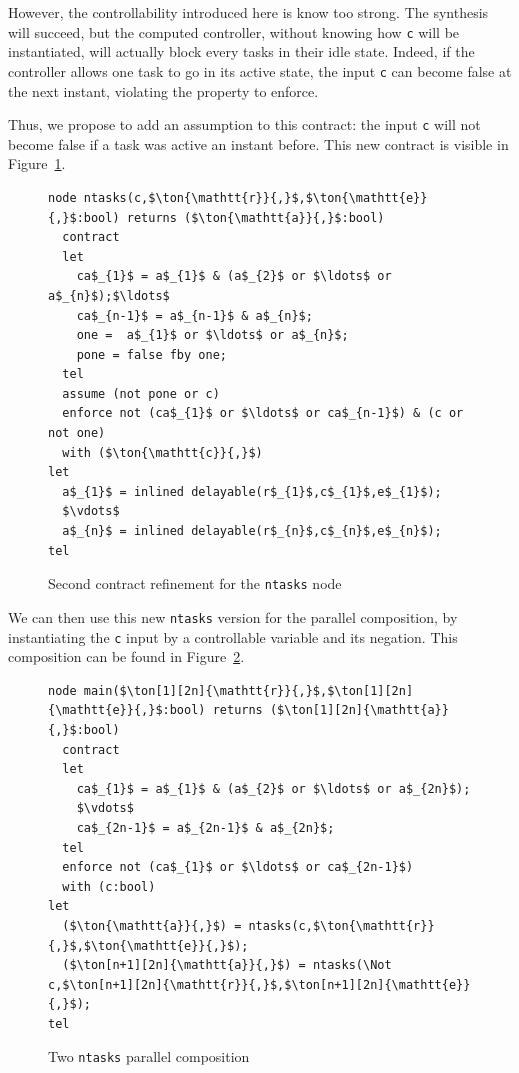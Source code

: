\documentclass[a4paper]{article}
\begin{document}
However, the controllability introduced here is know too strong. The synthesis
will succeed, but the computed controller, without knowing how \texttt{c} will
be instantiated, will actually block every tasks in their idle state. Indeed, if
the controller allows one task to go in its active state, the input \texttt{c}
can become false at the next instant, violating the property to enforce.

Thus, we propose to add an assumption to this contract: the input \texttt{c}
will not become false if a task was active an instant before. This new contract
is visible in Figure~\ref{fig:n-del-tasks-3}.

\begin{figure}[htb]
  \centering
\begin{lstlisting}
node ntasks(c,$\ton{\mathtt{r}}{,}$,$\ton{\mathtt{e}}{,}$:bool) returns ($\ton{\mathtt{a}}{,}$:bool)
  contract
  let
    ca$_{1}$ = a$_{1}$ & (a$_{2}$ or $\ldots$ or a$_{n}$);$\ldots$
    ca$_{n-1}$ = a$_{n-1}$ & a$_{n}$;
    one =  a$_{1}$ or $\ldots$ or a$_{n}$;
    pone = false fby one;
  tel
  assume (not pone or c)
  enforce not (ca$_{1}$ or $\ldots$ or ca$_{n-1}$) & (c or not one)
  with ($\ton{\mathtt{c}}{,}$)
let
  a$_{1}$ = inlined delayable(r$_{1}$,c$_{1}$,e$_{1}$); 
  $\vdots$
  a$_{n}$ = inlined delayable(r$_{n}$,c$_{n}$,e$_{n}$); 
tel
\end{lstlisting}
  \caption{Second contract refinement for the \texttt{ntasks} node}
  \label{fig:n-del-tasks-3}
\end{figure}

We can then use this new \texttt{ntasks} version for the parallel composition,
by instantiating the \texttt{c} input by a controllable variable and its
negation. This composition can be found in Figure~\ref{fig:ntasks-compos}.

\begin{figure}[htb]
  \centering
\begin{lstlisting}
node main($\ton[1][2n]{\mathtt{r}}{,}$,$\ton[1][2n]{\mathtt{e}}{,}$:bool) returns ($\ton[1][2n]{\mathtt{a}}{,}$:bool)
  contract
  let
    ca$_{1}$ = a$_{1}$ & (a$_{2}$ or $\ldots$ or a$_{2n}$);
    $\vdots$
    ca$_{2n-1}$ = a$_{2n-1}$ & a$_{2n}$;
  tel
  enforce not (ca$_{1}$ or $\ldots$ or ca$_{2n-1}$)
  with (c:bool)
let
  ($\ton{\mathtt{a}}{,}$) = ntasks(c,$\ton{\mathtt{r}}{,}$,$\ton{\mathtt{e}}{,}$); 
  ($\ton[n+1][2n]{\mathtt{a}}{,}$) = ntasks(\Not c,$\ton[n+1][2n]{\mathtt{r}}{,}$,$\ton[n+1][2n]{\mathtt{e}}{,}$); 
tel
\end{lstlisting}
  \caption{Two \texttt{ntasks} parallel composition}
  \label{fig:ntasks-compos}
\end{figure}
\end{document}
